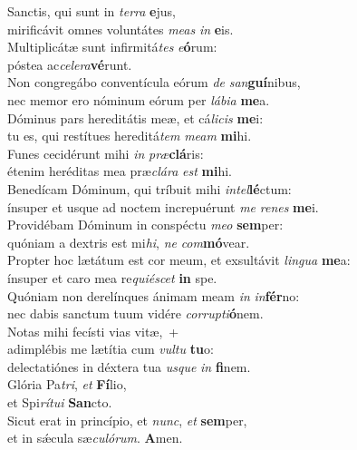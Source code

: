 \evenverse Sanctis, qui sunt in \textit{ter}\textit{ra} \textbf{e}jus,~\*\\
\evenverse mirificávit omnes voluntátes \textit{me}\textit{as} \textit{in} \textbf{e}is.\\
\oddverse Multiplicátæ sunt infirmitá\textit{tes} \textit{e}\textbf{ó}rum:~\*\\
\oddverse póstea ac\textit{ce}\textit{le}\textit{ra}\textbf{vé}runt.\\
\evenverse Non congregábo conventícula eórum \textit{de} \textit{san}\textbf{guí}nibus,~\*\\
\evenverse nec memor ero nóminum eórum per \textit{lá}\textit{bi}\textit{a} \textbf{me}a.\\
\oddverse Dóminus pars hereditátis meæ, et cá\textit{li}\textit{cis} \textbf{me}i:~\*\\
\oddverse tu es, qui restítues hereditá\textit{tem} \textit{me}\textit{am} \textbf{mi}hi.\\
\evenverse Funes cecidérunt mihi \textit{in} \textit{præ}\textbf{clá}ris:~\*\\
\evenverse étenim heréditas mea præ\textit{clá}\textit{ra} \textit{est} \textbf{mi}hi.\\
\oddverse Benedícam Dóminum, qui tríbuit mihi \textit{in}\textit{tel}\textbf{lé}ctum:~\*\\
\oddverse ínsuper et usque ad noctem increpuérunt \textit{me} \textit{re}\textit{nes} \textbf{me}i.\\
\evenverse Providébam Dóminum in conspéctu \textit{me}\textit{o} \textbf{sem}per:~\*\\
\evenverse quóniam a dextris est mi\textit{hi}, \textit{ne} \textit{com}\textbf{mó}vear.\\
\oddverse Propter hoc lætátum est cor meum, et exsultávit \textit{lin}\textit{gua} \textbf{me}a:~\*\\
\oddverse ínsuper et caro mea re\textit{qui}\textit{é}\textit{scet} \textbf{in} spe.\\
\evenverse Quóniam non derelínques ánimam meam \textit{in} \textit{in}\textbf{fér}no:~\*\\
\evenverse nec dabis sanctum tuum vidére \textit{cor}\textit{rup}\textit{ti}\textbf{ó}nem.\\
\oddverse Notas mihi fecísti vias vitæ,~+\\
\oddverse  adimplébis me lætítia cum \textit{vul}\textit{tu} \textbf{tu}o:~\*\\
\oddverse delectatiónes in déxtera tua \textit{us}\textit{que} \textit{in} \textbf{fi}nem.\\
\evenverse Glória Pa\textit{tri}, \textit{et} \textbf{Fí}lio,~\*\\
\evenverse et Spi\textit{rí}\textit{tu}\textit{i} \textbf{San}cto.\\
\oddverse Sicut erat in princípio, et \textit{nunc}, \textit{et} \textbf{sem}per,~\*\\
\oddverse et in sǽcula sæ\textit{cu}\textit{ló}\textit{rum}. \textbf{A}men.\\

